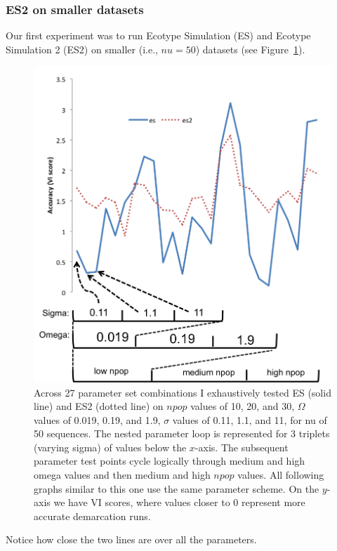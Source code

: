 \subsubsection*{ES2 on smaller datasets}
Our first experiment was to run Ecotype Simulation (ES) and Ecotype Simulation 2 (ES2) on smaller (i.e., $nu = 50$) datasets (see Figure~\ref{fig:ESvES2}).
\begin{figure}[h!]
  \centering
    \includegraphics[scale=0.75]{images/ResultGraphs/ResultGraphs-4}
      \caption[ES vs ES2 accuracy visualization on $nu = 50$.]{Across 27 parameter set combinations I exhaustively tested ES (solid line) and ES2 (dotted line) on $npop$ values of 10, 20, and 30, $\Omega$ values of 0.019, 0.19, and 1.9, $\sigma$ values of 0.11, 1.1, and 11, for nu of 50 sequences. The nested parameter loop is represented for 3 triplets (varying sigma) of values below the $x$-axis. The subsequent parameter test points cycle logically through medium and high omega values and then medium and high $npop$ values. All following graphs similar to this one use the same parameter scheme. On the $y$-axis we have VI scores, where values closer to 0 represent more accurate demarcation runs.}
    \label{fig:ESvES2}
\end{figure}
Notice how close the two lines are over all the parameters.
